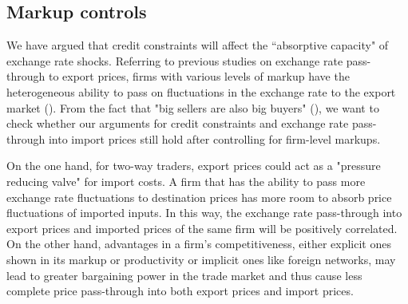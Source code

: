 \subsection{Markup controls}

We have argued that credit constraints will affect the ``absorptive capacity" of exchange rate shocks. Referring to previous studies on exchange rate pass-through to export prices, firms with various levels of markup have the heterogeneous ability to pass on fluctuations in the exchange rate to the export market (\cite{aik2019}). From the fact that "big sellers are also big buyers" (\cite{aik2014}), we want to check whether our arguments for credit constraints and exchange rate pass-through into import prices still hold after controlling for firm-level markups.

On the one hand, for two-way traders, export prices could act as a "pressure reducing valve" for import costs. A firm that has the ability to pass more exchange rate fluctuations to destination prices has more room to absorb price fluctuations of imported inputs. In this way, the exchange rate pass-through into export prices and imported prices of the same firm will be positively correlated. On the other hand, advantages in a firm's competitiveness, either explicit ones shown in its markup or productivity or implicit ones like foreign networks, may lead to greater bargaining power in the trade market and thus cause less complete price pass-through into both export prices and import prices.

